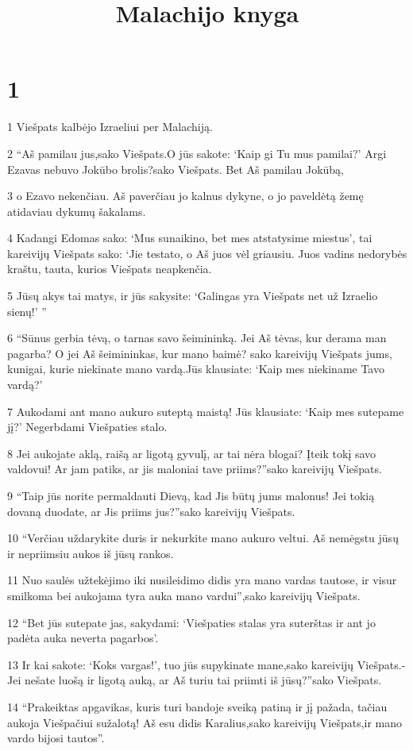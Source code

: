 

\title{Malachijo knyga}

\chapter{1}


\par 1 Viešpats kalbėjo Izraeliui per Malachiją. 
\par 2 “Aš pamilau jus,­sako Viešpats.­O jūs sakote: ‘Kaip gi Tu mus pamilai?’ Argi Ezavas nebuvo Jokūbo brolis?­sako Viešpats.­ Bet Aš pamilau Jokūbą, 
\par 3 o Ezavo nekenčiau. Aš paverčiau jo kalnus dykyne, o jo paveldėtą žemę atidaviau dykumų šakalams. 
\par 4 Kadangi Edomas sako: ‘Mus sunaikino, bet mes atstatysime miestus’, tai kareivijų Viešpats sako: ‘Jie testato, o Aš juos vėl griausiu. Juos vadins nedorybės kraštu, tauta, kurios Viešpats neapkenčia. 
\par 5 Jūsų akys tai matys, ir jūs sakysite: ‘Galingas yra Viešpats net už Izraelio sienų!’ ” 
\par 6 “Sūnus gerbia tėvą, o tarnas­ savo šeimininką. Jei Aš tėvas, kur derama man pagarba? O jei Aš šeimininkas, kur mano baimė?­ sako kareivijų Viešpats jums, kunigai, kurie niekinate mano vardą.­Jūs klausiate: ‘Kaip mes niekiname Tavo vardą?’ 
\par 7 Aukodami ant mano aukuro suteptą maistą! Jūs klausiate: ‘Kaip mes sutepame jį?’ Negerbdami Viešpaties stalo. 
\par 8 Jei aukojate aklą, raišą ar ligotą gyvulį, ar tai nėra blogai? Įteik tokį savo valdovui! Ar jam patiks, ar jis maloniai tave priims?”­sako kareivijų Viešpats. 
\par 9 “Taip jūs norite permaldauti Dievą, kad Jis būtų jums malonus! Jei tokią dovaną duodate, ar Jis priims jus?”­sako kareivijų Viešpats. 
\par 10 “Verčiau uždarykite duris ir nekurkite mano aukuro veltui. Aš nemėgstu jūsų ir nepriimsiu aukos iš jūsų rankos. 
\par 11 Nuo saulės užtekėjimo iki nusileidimo didis yra mano vardas tautose, ir visur smilkoma bei aukojama tyra auka mano vardui”,­sako kareivijų Viešpats. 
\par 12 “Bet jūs sutepate jas, sakydami: ‘Viešpaties stalas yra suterštas ir ant jo padėta auka neverta pagarbos’. 
\par 13 Ir kai sakote: ‘Koks vargas!’, tuo jūs supykinate mane,­sako kareivijų Viešpats.­Jei nešate luošą ir ligotą auką, ar Aš turiu tai priimti iš jūsų?”­sako Viešpats. 
\par 14 “Prakeiktas apgavikas, kuris turi bandoje sveiką patiną ir jį pažada, tačiau aukoja Viešpačiui sužalotą! Aš esu didis Karalius,­sako kareivijų Viešpats,­ir mano vardo bijosi tautos”.


